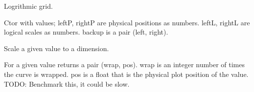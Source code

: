 \documentclass[letterpaper,10pt,english]{sphinxmanual}
\begin{document}
\begin{fulllineitems}
\label{\detokenize{ref/util/plot/PRESCfg:TotalDepth.util.plot.PRESCfg.LineTransLog10}}
Logrithmic grid.

\begin{fulllineitems}
\label{\detokenize{ref/util/plot/PRESCfg:TotalDepth.util.plot.PRESCfg.LineTransLog10.__init__}}
Ctor with values; leftP, rightP are physical positions as numbers.
leftL, rightL are logical scales as numbers.
backup is a pair (left, right).

\end{fulllineitems}


\begin{fulllineitems}
\label{\detokenize{ref/util/plot/PRESCfg:TotalDepth.util.plot.PRESCfg.LineTransLog10.L2P}}
Scale a given value to a dimension.

\end{fulllineitems}


\begin{fulllineitems}
\label{\detokenize{ref/util/plot/PRESCfg:TotalDepth.util.plot.PRESCfg.LineTransLog10.wrapPos}}
For a given value returns a pair (wrap, pos).
wrap is an integer number of times the curve is wrapped.
pos is a float that is the physical plot position of the value.
TODO: Benchmark this, it could be slow.

\end{fulllineitems}


\end{fulllineitems}

\end{document}
